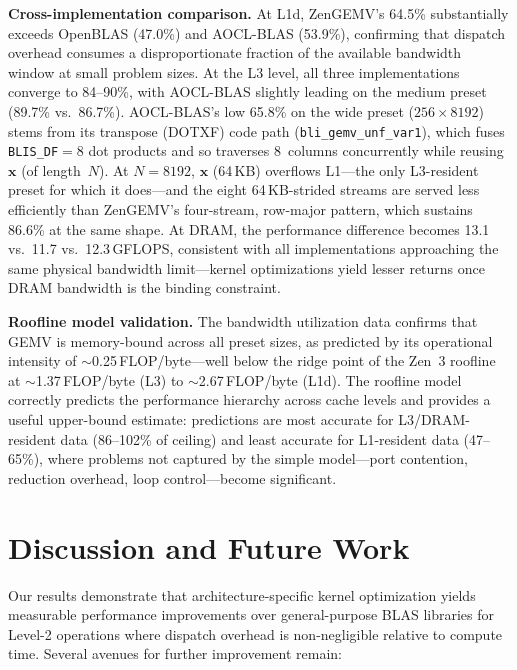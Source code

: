\documentclass[conference]{IEEEtran}
\begin{document}
\textbf{Cross-implementation comparison.}
At L1d, ZenGEMV's 64.5\% substantially exceeds OpenBLAS (47.0\%) and
AOCL-BLAS (53.9\%), confirming that dispatch overhead consumes a
disproportionate fraction of the available bandwidth window at small
problem sizes. At the L3 level, all three implementations converge to
84--90\%, with AOCL-BLAS slightly leading on the medium preset
(89.7\% vs.\ 86.7\%).
AOCL-BLAS's low 65.8\% on the wide preset ($256\times8192$) stems from its
transpose (DOTXF) code path (\texttt{bli\_gemv\_unf\_var1}), which fuses
\texttt{BLIS\_DF}$=8$ dot products and so traverses 8~columns concurrently while
reusing~$\mathbf{x}$ (of length~$N$). At $N=8192$, $\mathbf{x}$ (64\,KB)
overflows L1---the only L3-resident preset for which it does---and the eight
64\,KB-strided streams are served less efficiently than ZenGEMV's four-stream,
row-major pattern, which sustains 86.6\% at the same shape.
At DRAM, the performance difference becomes 13.1 vs.\ 11.7 vs.\
12.3\,GFLOPS, consistent with all implementations approaching the same
physical bandwidth limit---kernel optimizations yield lesser returns
once DRAM bandwidth is the binding constraint.

\textbf{Roofline model validation.}
The bandwidth utilization data confirms that GEMV is memory-bound across
all preset sizes, as predicted by its operational intensity of
$\sim$0.25\,FLOP/byte---well below the ridge point of the Zen~3
roofline at $\sim$1.37\,FLOP/byte (L3) to $\sim$2.67\,FLOP/byte
(L1d). The roofline model correctly predicts the performance hierarchy
across cache levels and provides a useful upper-bound estimate:
predictions are most accurate for L3/DRAM-resident data
(86--102\% of ceiling) and least accurate for L1-resident data
(47--65\%), where problems not captured by the
simple model---port contention, reduction overhead, loop control---become significant.


\section{Discussion and Future Work}

Our results demonstrate that architecture-specific kernel optimization yields
measurable performance improvements over general-purpose BLAS libraries for Level-2
operations where dispatch overhead is non-negligible relative to compute time.
Several avenues for further improvement remain:
\end{document}
